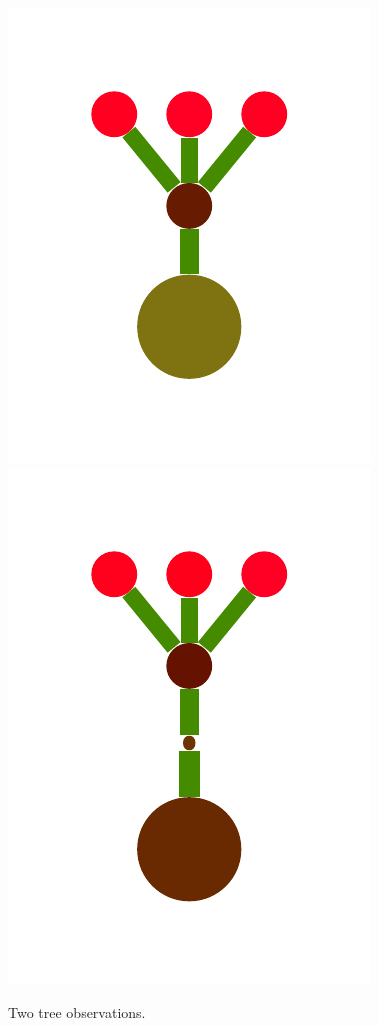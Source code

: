 \documentclass[a4paper,10pt]{article}
\begin{document}
\begin{figure}[t]
  \begin{minipage}{.7\textwidth}
    
  \end{minipage}    
  \begin{minipage}{.25\textwidth}
    \includegraphics[scale=.26]{../figures/vector/2-2-two-trees-0.pdf}
    \includegraphics[scale=.26]{../figures/vector/2-2-two-trees-1.pdf}
  \end{minipage}        
\caption{Two tree observations.}
\label{fig:tree-obs}
\end{figure}
\end{document}
